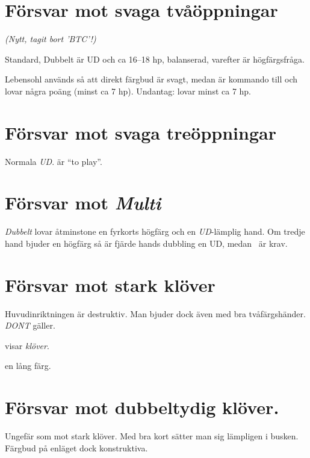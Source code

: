 \section{Försvar mot svaga två\-öpp\-ning\-ar}

\emph{(Nytt, tagit bort 'BTC'!)}

Standard, Dubbelt är UD och  ca 16--18 hp, balanserad, varefter
 är högfärgsfråga.
 

Lebensohl används så att direkt färgbud är svagt, medan  är
kommando till  och lovar några poäng (minst ca 7 hp). Undantag:
 lovar minst ca 7 hp.

\section{Försvar mot svaga tre\-öpp\-ning\-ar}

Normala \emph{UD}.  är ``to play''.

\section{Försvar mot {\em Multi} }

{\em Dubbelt} lovar åtminstone en fyrkorts högfärg och en {\em
UD}-lämplig hand. Om tredje hand bjuder en högfärg så är fjärde hands
dubbling en UD, medan \pass\ är krav.

\section{Försvar mot stark klöver}

Huvudinriktningen  är destruktiv. Man bjuder dock även med bra
två\-färgs\-hän\-der. \emph{DONT} gäller.

\bbe
   \item[Dubbelt] visar \emph{klöver}.
   \item[\NT{1}] en lång färg.
\ebe

\section{Försvar mot dubbeltydig klöver.}

Ungefär som mot stark klöver. Med bra kort sätter man sig lämpligen i
busken. Färgbud på enläget dock konstruktiva.


